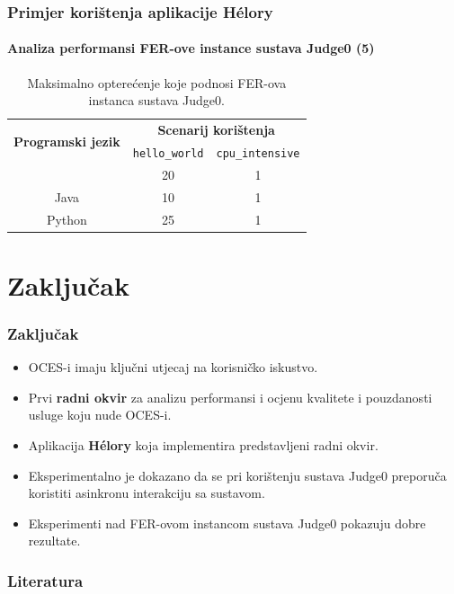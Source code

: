 \documentclass{beamer}
\newif\ifplacelogo
\begin{document}
\begin{frame}
\frametitle{Primjer korištenja aplikacije Hélory}
\framesubtitle{Analiza performansi FER-ove instance sustava Judge0 (5)}
\begin{table}[htb]
\centering
\begin{tabular}[t]{|c|c|c|}
	\hline
	\multirow{2}{*}{\bfseries Programski jezik} & 
	\multicolumn{2}{|c|}{\bfseries Scenarij korištenja}\\ \cline{2-3}
	& \lstinline{hello_world}&\lstinline{cpu_intensive} \\ \hline
	\text{C++} & 20 & 1 \\
	Java & 10 & 1 \\
	Python & 25 & 1 \\
	\hline
\end{tabular}
\caption{Maksimalno opterećenje koje podnosi FER-ova instanca sustava Judge0.}
\end{table}
\end{frame}

\section{Zaključak}
\begin{frame}
\frametitle{Zaključak}
\begin{itemize}
	\item OCES-i imaju ključni utjecaj na korisničko iskustvo.
	\item Prvi \textbf{radni okvir} za analizu performansi i ocjenu kvalitete i pouzdanosti usluge koju nude OCES-i.
	\item Aplikacija \textbf{Hélory} koja implementira predstavljeni radni okvir.
	\item Eksperimentalno je dokazano da se pri korištenju sustava Judge0 preporuča koristiti asinkronu interakciju sa sustavom.
	\item Eksperimenti nad FER-ovom instancom sustava Judge0 pokazuju dobre rezultate.
\end{itemize}
\end{frame}

\placelogofalse
\begin{frame}
\frametitle{Literatura}


\end{frame}
\placelogotrue
\end{document}
